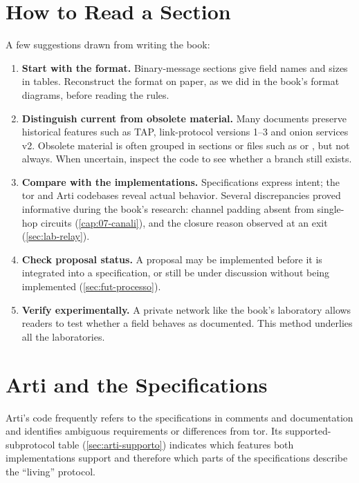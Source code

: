 \section{How to Read a Section}\label{sec:C-lettura}

A few suggestions drawn from writing the book:
\begin{enumerate}
  \item \textbf{Start with the format.} Binary-message sections give field names and sizes in tables. Reconstruct the format on paper, as we did in the book's format diagrams, before reading the rules.
  \item \textbf{Distinguish current from obsolete material.} Many documents preserve historical features such as TAP, link-protocol versions 1--3 and onion services v2. Obsolete material is often grouped in sections or files such as  or , but not always. When uncertain, inspect the code to see whether a branch still exists.
  \item \textbf{Compare with the implementations.} Specifications express intent; the tor and Arti codebases reveal actual behavior. Several discrepancies proved informative during the book's research: channel padding absent from single-hop circuits (\cref{cap:07-canali}), and the closure reason observed at an exit (\cref{sec:lab-relay}).
  \item \textbf{Check proposal status.} A proposal may be implemented before it is integrated into a specification, or still be under discussion without being implemented (\cref{sec:fut-processo}).
  \item \textbf{Verify experimentally.} A private network like the book's laboratory allows readers to test whether a field behaves as documented. This method underlies all the laboratories.
\end{enumerate}

\section{Arti and the Specifications}\label{sec:C-arti}

Arti's code frequently refers to the specifications in comments and documentation and identifies ambiguous requirements or differences from tor. Its supported-subprotocol table (\cref{sec:arti-supporto}) indicates which features both implementations support and therefore which parts of the specifications describe the \enquote{living} protocol.
